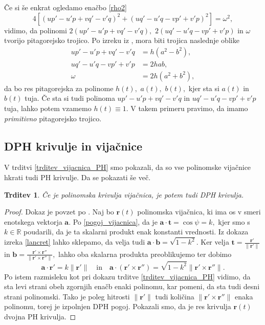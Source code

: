 \documentclass[12pt,a4paper,twoside]{article}
\theoremstyle{definition} %
\theoremstyle{plain} %
\newtheorem{trditev}[definicija]{Trditev}
\numberwithin{equation}{section}  %
\newcommand{\R}{\mathbb R}
\newcommand{\binormala}{\frac{\mathbf{r}'\times\mathbf{r}''}{\lVert \mathbf{r}'\times\mathbf{r}'' \rVert}}
\newcommand{\tV}{\mathbf{t}}
\newcommand{\aV}{\mathbf{a}}
\newcommand{\bV}{\mathbf{b}}
\newcommand{\rV}{\mathbf{r}}
\newcommand{\ndr}{\lVert \mathbf{r}'\rVert} %
\newcommand{\ndrtddr}{\lVert \mathbf{r}'\times \mathbf{r}'' \rVert} %
\begin{document}
Če si še enkrat ogledamo enačbo \eqref{rho2}
\begin{equation}
	4[(up'-u'p+vq'-v'q)^2+(uq'-u'q-vp'+v'p)^2]=\omega^2,
\end{equation}
vidimo, da polinomi $2(up'-u'p+vq'-v'q),$ $2(uq'-u'q-vp'+v'p)$ in $\omega$ tvorijo pitagorejsko trojico. Po izreku iz \cite{kubota1972pythagorean}, mora biti trojica naslednje oblike
\begin{align}
	up'-u'p+vq'-v'q&=h(a^2-b^2), \nonumber \\
	uq'-u'q-vp'+v'p&=2hab, \nonumber \\
	\omega&=2h(a^2+b^2), \label{kubota}
\end{align}
da bo res pitagorejska za polinome $h(t),$ $a(t),$ $b(t),$ kjer sta si $a(t)$ in $b(t)$ tuja. Če sta si tudi polinoma $up'-u'p+vq'-v'q$ in $uq'-u'q-vp'+v'p$ tuja, lahko potem vzamemo $h(t)\equiv 1.$ V takem primeru pravimo, da imamo \emph{primitivno} pitagorejsko trojico.

\subsection{DPH krivulje in vijačnice}
\label{sec_DPH_in_vijacnice}

V trditvi \ref{trditev_vijacnica_PH} smo pokazali, da so vse polinomske vijačnice hkrati tudi PH krivulje. Da se pokazati še več.
\begin{trditev}
	\label{trditev_vijacnica_DPH}
	Če je polinomska krivulja vijačnica, je potem tudi DPH krivulja.
\end{trditev}
\begin{proof}
	Dokaz je povzet po \cite{beltranmonterde}. Naj bo $\rV(t)$ polinomska vijačnica, ki ima os v smeri enotskega vektorja $\aV.$ Po \eqref{pogoj_vijacnica}, da je $\aV\cdot\tV=\cos \psi=k,$ kjer smo s $k \in \R$ poudarili, da je ta skalarni produkt enak konstanti vrednosti. Iz dokaza izreka \ref{lancret} lahko sklepamo, da velja tudi $\aV\cdot\bV=\sqrt{1-k^2}.$ Ker velja $\tV=\frac{\rV'}{\lVert \rV' \rVert}$ in $\bV=\binormala,$ lahko oba skalarna produkta preoblikujemo ter dobimo
	\begin{equation}
		\aV\cdot\rV'=k\ndr \quad \text{in} \quad \aV\cdot (\rV'\times\rV'')=\sqrt{1-k^2}\ndrtddr .
	\end{equation}
	Po istem razmisleku kot pri dokazu trditve \ref{trditev_vijacnica_PH} vidimo, da sta levi strani obeh zgornjih enačb enaki polinomu, kar pomeni, da sta tudi desni strani polinomski. Tako je poleg hitrosti $\ndr$ tudi količina $\ndrtddr$ enaka polinomu, torej je izpolnjen DPH pogoj. Pokazali smo, da je res krivulja $\rV(t)$ dvojna PH krivulja.
\end{proof}
\end{document}
